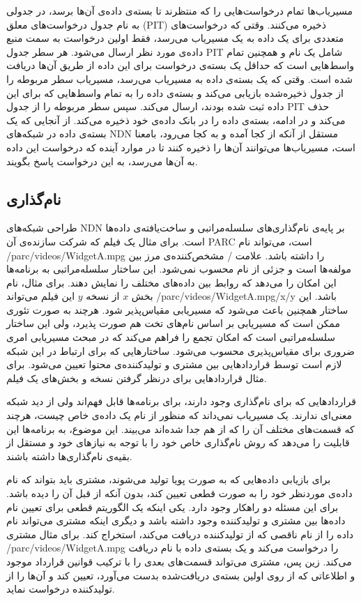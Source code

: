 مسیریاب‌ها تمام درخواست‌‌هایی را که منتظرند تا بسته‌ی داده‌ی آن‌ها برسد، در جدولی به نام جدول درخواست‌های معلق
(PIT)
ذخیره‌ می‌کنند. وقتی که درخواست‌‌‌های متعددی برای یک داده به یک مسیریاب می‌رسد، فقط اولین درخواست به سمت منبع داده‌ی مورد نظر ارسال می‌شود. هر سطر جدول PIT شامل یک نام و همچنین تمام واسط‌‌هایی است که حداقل یک بسته‌ی درخواست برای این داده از طریق آن‌ها دریافت شده است. وقتی که یک بسته‌ی داده به مسیریاب می‌رسد، مسیریاب سطر مربوطه را از جدول ذخیره‌شده بازیابی می‌کند و بسته‌ی داده را به تمام واسط‌هایی که برای این داده ثبت شده بودند، ارسال می‌کند. سپس سطر مربوطه را از جدول PIT  حذف می‌کند و در ادامه، بسته‌‌ی داده را در بانک داده‌ی خود ذخیره می‌کند. از آنجایی که یک بسته‌ی داده در شبکه‌های NDN مستقل از آنکه از کجا آمده و به کجا می‌رود، بامعنا است، مسیریاب‌ها می‌توانند آن‌ها را ذخیره کنند تا در موارد آینده که درخواست این داده به آن‌ها می‌رسد، به این درخواست پاسخ بگویند. 

\subsection{نام‌گذاری}
طراحی شبکه‌های NDN بر پایه‌ی نام‌گذاری‌های سلسله‌مراتبی و ساخت‌یافته‌ی داده‌ها است. برای مثال یک فیلم که شرکت سازنده‌ی آن PARC است، می‌تواند نام /parc/videos/WidgetA.mpg را داشته باشد. علامت / مشخص‌کننده‌ی مرز بین مولفه‌ها است و جزئی از نام محسوب نمی‌شود. این ساختار سلسله‌مراتبی به برنامه‌ها این امکان را می‌دهد که روابط بین داده‌های مختلف را نمایش دهند. برای مثال، نام بخش $x$ از نسخه $y$ این فیلم می‌تواند /parc/videos/WidgetA.mpg/x/y باشد. این ساختار همچنین باعث می‌شود که مسیریابی مقیاس‌پذیر شود. هرچند به صورت تئوری ممکن است که مسیریابی بر اساس نام‌های تخت  هم صورت پذیرد،
\cite{rofl}
 ولی این ساختار سلسله‌مراتبی است که امکان تجمع را فراهم می‌کند که در مبحث مسیریابی امری ضروری برای مقیاس‌پذیری محسوب می‌شود. ساختارهایی که برای ارتباط در این شبکه لازم است توسط قرارداد‌هایی بین مشتری و تولیدکننده‌ی محتوا تعیین می‌شود. برای مثال قراردادهایی برای درنظر گرفتن نسخه و بخش‌های یک فیلم.
 
قراردادهایی که برای نام‌گذاری وجود دارند، برای برنامه‌ها قابل فهم‌اند ولی از دید شبکه معنی‌ای ندارند. یک مسیریاب نمی‌داند که منظور از نام یک داده‌ی خاص چیست، هرچند که قسمت‌های مختلف آن را که از هم جدا شده‌اند می‌بیند. این موضوع، به برنامه‌ها این قابلیت را می‌دهد که روش نام‌گذاری خاص خود را با توجه به نیاز‌های خود و مستقل از بقیه‌ی نام‌گذاری‌ها داشته باشند. 

برای بازیابی داده‌هایی که به صورت پویا تولید می‌شوند، مشتری باید بتواند که نام داده‌ی موردنظر خود را به صورت قطعی تعیین کند، بدون آنکه از قبل آن را دیده باشد. برای این مسئله دو راهکار وجود دارد. یکی اینکه یک الگوریتم قطعی برای تعیین نام داده‌ها بین مشتری و تولیدکننده وجود داشته باشد  و دیگری اینکه مشتری می‌تواند نام داده را از نام ناقصی که از تولیدکننده دریافت‌ می‌کند، استخراج کند. برای مثال مشتری /parc/videos/WidgetA.mpg را درخواست می‌کند و یک بسته‌ی داده‌ با نام  دریافت می‌کند. زین پس، مشتری می‌تواند قسمت‌های بعدی را با ترکیب قوانین قرارداد موجود و اطلاعاتی که از روی اولین بسته‌ی دریافت‌شده بدست می‌آورد، تعیین کند و آن‌ها را از تولیدکننده درخواست نماید. 

